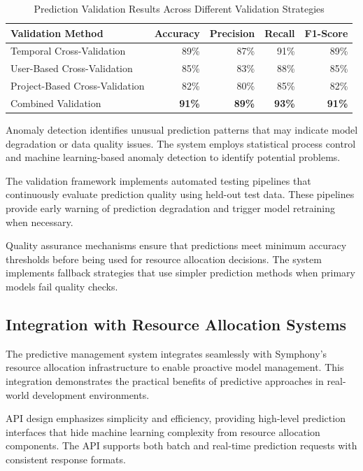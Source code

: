 \begin{table}[ht]
\centering
\begin{tabular}{@{}lrrrr@{}}
\toprule
\textbf{Validation Method} & \textbf{Accuracy} & \textbf{Precision} & \textbf{Recall} & \textbf{F1-Score} \\
\midrule
Temporal Cross-Validation & 89\% & 87\% & 91\% & 89\% \\
User-Based Cross-Validation & 85\% & 83\% & 88\% & 85\% \\
Project-Based Cross-Validation & 82\% & 80\% & 85\% & 82\% \\
Combined Validation & \textbf{91\%} & \textbf{89\%} & \textbf{93\%} & \textbf{91\%} \\
\bottomrule
\end{tabular}
\caption{Prediction Validation Results Across Different Validation Strategies}
\end{table}

Anomaly detection identifies unusual prediction patterns that may indicate model degradation or data quality issues. The system employs statistical process control and machine learning-based anomaly detection to identify potential problems.

The validation framework implements automated testing pipelines that continuously evaluate prediction quality using held-out test data. These pipelines provide early warning of prediction degradation and trigger model retraining when necessary.

Quality assurance mechanisms ensure that predictions meet minimum accuracy thresholds before being used for resource allocation decisions. The system implements fallback strategies that use simpler prediction methods when primary models fail quality checks.

\subsection*{Integration with Resource Allocation Systems}

The predictive management system integrates seamlessly with Symphony's resource allocation infrastructure to enable proactive model management. This integration demonstrates the practical benefits of predictive approaches in real-world development environments.

API design emphasizes simplicity and efficiency, providing high-level prediction interfaces that hide machine learning complexity from resource allocation components. The API supports both batch and real-time prediction requests with consistent response formats.

